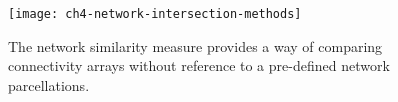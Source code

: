


\begin{figure}[t]
	\centering
	\texttt{[image: ch4-network-intersection-methods]}
    \caption[Method for comparing connectivity arrays.]{The network similarity measure provides a way of comparing connectivity arrays without reference to a pre-defined network parcellations.}
	\label{fig:ch4-network-intersection-methods}
\end{figure}


